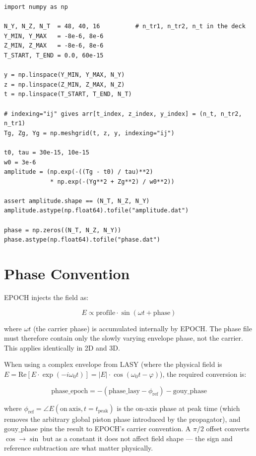 \documentclass[11pt,a4paper]{article}
\begin{document}
\begin{lstlisting}[style=python]
import numpy as np

N_Y, N_Z, N_T  = 48, 40, 16          # n_tr1, n_tr2, n_t in the deck
Y_MIN, Y_MAX   = -8e-6, 8e-6
Z_MIN, Z_MAX   = -8e-6, 8e-6
T_START, T_END = 0.0, 60e-15

y = np.linspace(Y_MIN, Y_MAX, N_Y)
z = np.linspace(Z_MIN, Z_MAX, N_Z)
t = np.linspace(T_START, T_END, N_T)

# indexing="ij" gives arr[t_index, z_index, y_index] = (n_t, n_tr2, n_tr1)
Tg, Zg, Yg = np.meshgrid(t, z, y, indexing="ij")

t0, tau = 30e-15, 10e-15
w0 = 3e-6
amplitude = (np.exp(-((Tg - t0) / tau)**2)
             * np.exp(-(Yg**2 + Zg**2) / w0**2))

assert amplitude.shape == (N_T, N_Z, N_Y)
amplitude.astype(np.float64).tofile("amplitude.dat")

phase = np.zeros((N_T, N_Z, N_Y))
phase.astype(np.float64).tofile("phase.dat")
\end{lstlisting}

\section{Phase Convention}

EPOCH injects the field as:

\begin{equation}
E \propto \mathrm{profile} \cdot \sin(\omega t + \mathrm{phase})
\end{equation}

where $\omega t$ (the carrier phase) is accumulated internally by EPOCH.
The phase file must therefore contain only the slowly varying envelope
phase, not the carrier. This applies identically in 2D and 3D.

When using a complex envelope from LASY (where the physical field is
$E = \mathrm{Re}[E \cdot \exp(-i\omega_0 t)] = |E| \cdot \cos(\omega_0 t -
\varphi)$), the required conversion is:

\begin{equation}
\mathrm{phase\_epoch} = -(\mathrm{phase\_lasy} - \phi_{\mathrm{ref}}) -
\mathrm{gouy\_phase}
\end{equation}

where $\phi_{\mathrm{ref}} = \angle E(\mathrm{on\ axis}, t = t_{\mathrm{peak}})$
is the on-axis phase at peak time (which removes the arbitrary global
piston phase introduced by the propagator), and $\mathrm{gouy\_phase}$
pins the result to EPOCH's carrier convention. A $\pi/2$ offset converts
$\cos \to \sin$ but as a constant it does not affect field shape --- the
sign and reference subtraction are what matter physically.
\end{document}
